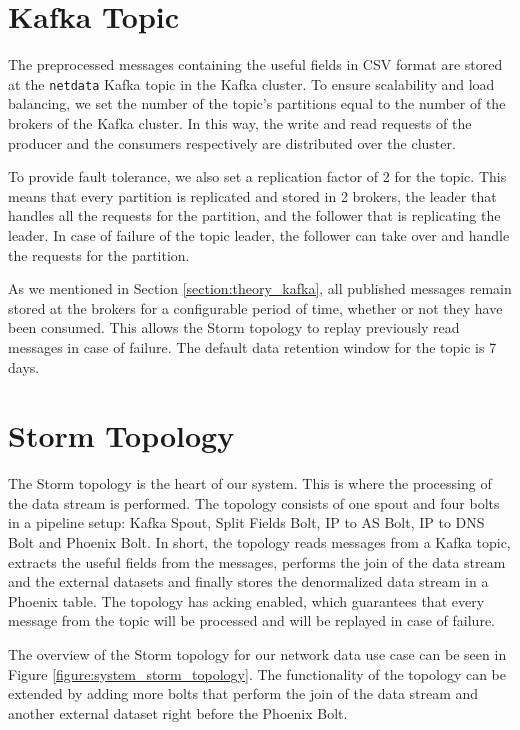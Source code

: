 \section{Kafka Topic}

The preprocessed messages containing the useful fields in CSV format are stored at the \texttt{netdata} Kafka topic in the Kafka cluster. To ensure scalability and load balancing, we set the number of the topic's partitions equal to the number of the brokers of the Kafka cluster. In this way, the write and read requests of the producer and the consumers respectively are distributed over the cluster.

To provide fault tolerance, we also set a replication factor of 2 for the topic. This means that every partition is replicated and stored in 2 brokers, the leader that handles all the requests for the partition, and the follower that is replicating the leader. In case of failure of the topic leader, the follower can take over and handle the requests for the partition.

As we mentioned in Section \ref{section:theory_kafka}, all published messages remain stored at the brokers for a configurable period of time, whether or not they have been consumed. This allows the Storm topology to replay previously read messages in case of failure. The default data retention window for the topic is 7 days.


\section{Storm Topology}

The Storm topology is the heart of our system. This is where the processing of the data stream is performed. The topology consists of one spout and four bolts in a pipeline setup: Kafka Spout, Split Fields Bolt, IP to AS Bolt, IP to DNS Bolt and Phoenix Bolt. In short, the topology reads messages from a Kafka topic, extracts the useful fields from the messages, performs the join of the data stream and the external datasets and finally stores the denormalized data stream in a Phoenix table. The topology has acking enabled, which guarantees that every message from the topic will be processed and will be replayed in case of failure.

The overview of the Storm topology for our network data use case can be seen in Figure \ref{figure:system_storm_topology}. The functionality of the topology can be extended by adding more bolts that perform the join of the data stream and another external dataset right before the Phoenix Bolt.

